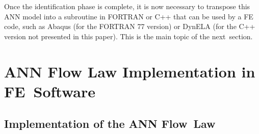 \documentclass[algorithms,article,accept,pdftex,oneauthors]{Definitions/mdpi}
\begin{document}
Once the identification phase is complete, it is now necessary to transpose this ANN model into a subroutine in FORTRAN or C++ that can be used by a FE code, such as Abaqus (for the FORTRAN 77 version) or DynELA (for the C++ version not presented in this paper).
This is the main topic of the next~section.

\section{ANN Flow Law Implementation in FE~Software}\label{sec:Use}


\subsection{Implementation of the ANN Flow~Law}\label{sec:Implementation}
\end{document}
